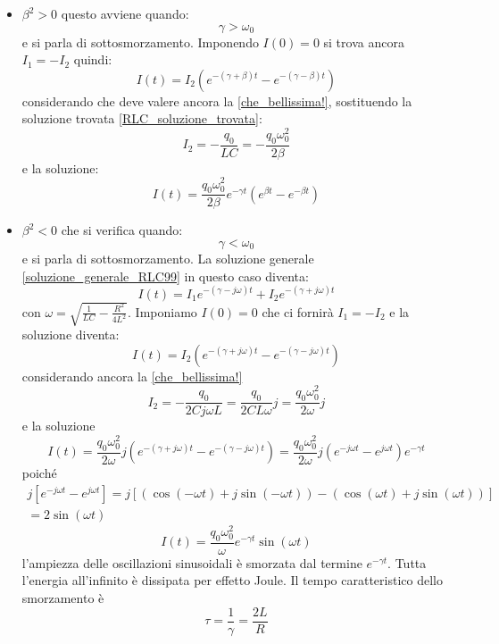 \begin{itemize}
  \item{$\beta^2>0$} questo avviene quando:
  \begin{equation}
    \gamma>\omega_0
  \end{equation}
  e si parla di sottosmorzamento. Imponendo $I(0)=0$ si trova ancora $I_1=-I_2$ quindi:
  \begin{equation}
    I(t)=I_2\left(e^{-(\gamma+\beta)t}-e^{-(\gamma-\beta)t}\right)
    \label{RLC_soluzione_trovata}
  \end{equation}
  considerando che deve valere ancora la \eqref{che_bellissima!}, sostituendo la soluzione trovata \eqref{RLC_soluzione_trovata}:
  \begin{equation}
    I_2=-\frac{q_0}{LC}=-\frac{q_0\omega_0^2}{2\beta}
  \end{equation}
  e la soluzione:
  \begin{equation}
    I(t)=\frac{q_0\omega_0^2}{2\beta}e^{-\gamma t}\left(e^{\beta t}-e^{-\beta t}\right)
  \end{equation}
  \item{$\beta^2<0$} che si verifica quando:
  \begin{equation}
    \gamma<\omega_0
  \end{equation}
  e si parla di sottosmorzamento. La soluzione generale \eqref{soluzione_generale_RLC99} in questo caso diventa:
  \begin{equation}
    I(t)=I_1e^{-(\gamma-j \omega)t}+I_2e^{-(\gamma+j \omega)t}
  \end{equation}
  con $\omega=\sqrt{\frac{1}{LC}-\frac{R^2}{4L^2}}$. Imponiamo $I(0)=0$ che ci fornirà $I_1=-I_2$ e la soluzione diventa:
  \begin{equation}
    I(t)=I_2\left(e^{-(\gamma+j\omega)t}-e^{-(\gamma-j\omega)t}\right)
  \end{equation}
  considerando ancora la \eqref{che_bellissima!}
  \begin{equation}
    I_2=-\frac{q_0}{2Cj\omega L}=\frac{q_0}{2CL\omega}j=\frac{q_0\omega_0^2}{2\omega}j
  \end{equation}
  e la soluzione
  \begin{equation}
    I(t)=\frac{q_0\omega_0^2}{2\omega}j\left(e^{-(\gamma+j\omega)t}-e^{-(\gamma-j\omega)t}\right)=\frac{q_0\omega_0^2}{2\omega}j\left(e^{-j\omega t}-e^{j\omega t}\right)e^{-\gamma t}
  \end{equation}
  poiché
  \begin{multline}
    j\left[e^{-j\omega t}-e^{j\omega t}\right]=j\left[\left(\cos(-\omega t)+j\sin(-\omega
      t)\right)-\left(\cos(\omega t)+j\sin(\omega t)\right)\right]\\
    =2\sin(\omega t)
  \end{multline}
  \begin{equation}
    I(t)=\frac{q_0\omega_0^2}{\omega}e^{-\gamma t}\sin(\omega t)
  \end{equation}
  l'ampiezza delle oscillazioni sinusoidali è smorzata dal termine $e^{-\gamma t}$. Tutta l'energia all'infinito è dissipata per effetto Joule. Il tempo caratteristico dello smorzamento è
  \begin{equation}
    \tau=\frac{1}{\gamma}=\frac{2L}{R}
  \end{equation}
\end{itemize}

